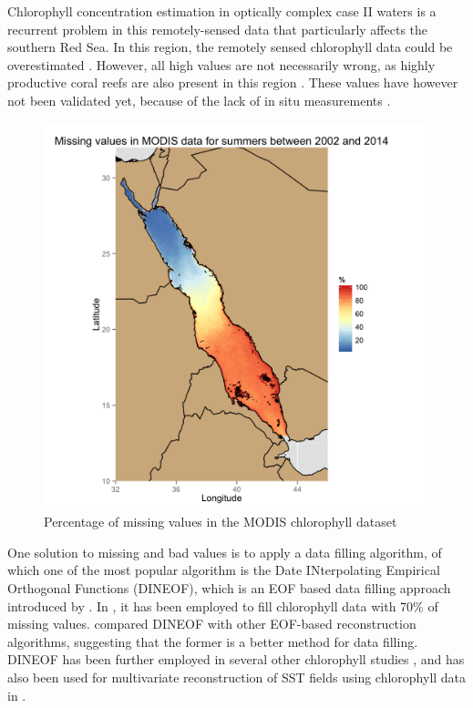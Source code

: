 Chlorophyll concentration estimation in optically complex case II waters is a
recurrent problem in this remotely-sensed data that particularly affects the
southern Red Sea.  In this region, the remotely sensed chlorophyll data could
be overestimated \citep{Raitsos2013}. However, all high values are not
necessarily wrong, as highly productive coral reefs are also present in this
region \citep{Raitsos2013}. These values have however not been validated yet,
because of the lack of in situ measurements \citep{Raitsos2013}.

\begin{figure}[h]
    \centering
    \includegraphics[scale=.15]{figures/modis_missing_values_summer.png}
    \caption{Percentage of missing values in the MODIS chlorophyll dataset}
    \label{misval_modis}
\end{figure}

One solution to missing and bad values is to apply a data filling algorithm, of
which one of the most popular algorithm is the Date INterpolating Empirical
Orthogonal Functions (DINEOF), which is an EOF based data filling approach
introduced by \citet{Beckers2003}. In \citet{Sicarjobs2011}, it has been
employed to fill chlorophyll data with 70\% of missing values.
\citet{Taylor2013} compared DINEOF with other EOF-based reconstruction
algorithms, suggesting that the former is a better method for data filling.
DINEOF has been further employed in several other chlorophyll studies
\citep{Miles2010, Waite2013}, and has also been used for multivariate
reconstruction of SST fields using chlorophyll data in \citet{Alvera2007}. 

